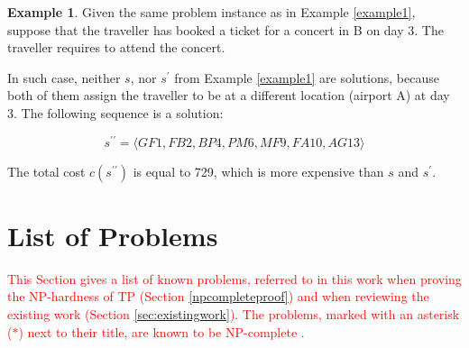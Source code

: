 \documentclass{mprop}
\theoremstyle{definition}
\newtheorem{example}{Example}
\begin{document}
\begin{example}
\label{example2}
Given the same problem instance as in Example \ref{example1}, suppose that the traveller has booked a ticket for a concert in B on day 3. The traveller requires to attend the concert.
\end{example}

\begin{solution}
In such case, neither $s$, nor $s^{\prime}$ from Example \ref{example1} are solutions, because both of them assign the traveller to be at a different location (airport A) at day 3. The following sequence is a solution:

$$ s^{\prime\prime} = \langle GF1, FB2, BP4, PM6, MF9, FA10, AG13\rangle $$

The total cost $c(s^{\prime\prime})$ is equal to 729, which is more expensive than $s$ and $s^{\prime}$.
\end{solution}

\section{List of Problems}
\label{npcompleteproblems}

\textcolor{red}{This Section gives a list of known problems, referred to in this work when proving the NP-hardness of TP (Section \ref{npcompleteproof}) and when reviewing the existing work (Section \ref{sec:existingwork}). The problems, marked with an asterisk ($\ast$) next to their title, are known to be NP-complete \citep{thebible}.}
\end{document}
